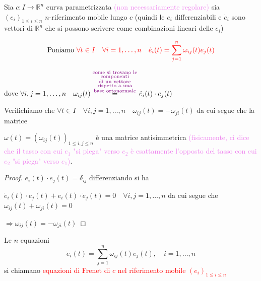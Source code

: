         \begin{definizione}
        \mbox{}

        Sia $c: I \to \mathbb{R}^n$ curva parametrizzata \textcolor{violet}{(non necessariamente regolare)} sia $\left(e_i\right)_{1 \leq i \leq n}$ $n$-riferimento mobile lungo $c$
        \textcolor{blu}{(quindi le $e_i$ differenziabili e $\dot{e}_i$ sono vettori di $\mathbb{R}^n$ che si possono scrivere come combinazioni lineari delle $e_i$)}

        \[ \text{Poniamo } \textcolor{red}{\forall t \in I \quad \forall i =1, \dots, n \quad \dot{e}_i(t)=\sum_{j=1}^{n} \omega_{ij}(t) e_j(t)} \]

        dove $\forall i,j = 1, \dots, n \quad \omega_{ij}(t) \overset{\textcolor{violet}{\substack{ \text{come si trovano le} \\ \text{componenti} \\ \text{di un vettore} \\ \text{rispetto a una} \\  \text{base ortonormale}}}}{=} \dot{e}_i(t) \cdot e_j(t)$ 

        Verifichiamo che $\forall t \in I \quad \forall i,j = 1, \dots, n \quad \omega_{ij}(t) = -\omega_{ji}(t)$ da cui segue che la matrice 
        
        $\omega(t) = \left( \omega_{ij}(t) \right)_{1 \leq i,j \leq n}$ è una matrice antisimmetrica 
        \textcolor{violet}{(fisicamente, ci dice che il tasso con cui $e_1$ "si piega" verso $e_2$ è esattamente l'opposto del tasso con cui $e_2$ "si piega" verso $e_1$)}.
        \begin{proof}
        $e_i(t) \cdot e_j(t) = \delta_{ij}$ differenziando si ha 

        $\dot{e}_i(t) \cdot e_j(t) + e_i(t) \cdot \dot{e}_j(t) = 0 \quad \forall i,j = 1, \dots, n$
        da cui segue che $\omega_{ij}(t) + \omega_{ji}(t) = 0$ 
        
        $\Rightarrow \omega_{ij}(t) = -\omega_{ji}(t)$
        \end{proof}

        Le $n$ equazioni 
        \begin{equation}
        \label{eq:equazioni_di_Frenet}
        \dot{e}_i(t) = \sum_{j=1}^{n} \omega_{ij}(t) e_j(t), \quad i = 1, \dots, n   
        \end{equation}
        si chiamano \textcolor{red}{equazioni di Frenet di $c$ nel riferimento mobile $\left(e_i\right)_{1 \leq i \leq n}$}


\end{definizione}
